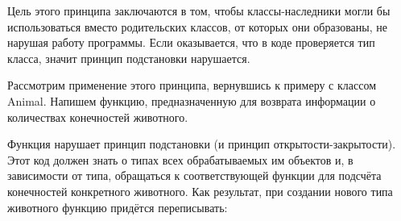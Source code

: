 \documentclass[a4paper]{article}
\begin{document}
Цель этого принципа заключаются в том, чтобы классы-наследники могли бы использоваться вместо родительских классов, от которых они образованы, не нарушая работу программы. Если оказывается, что в коде проверяется тип класса, значит принцип подстановки нарушается.

\newpage
Рассмотрим применение этого принципа, вернувшись к примеру с классом Animal. Напишем функцию, предназначенную для возврата информации о количествах конечностей животного.

\begin{figure}[h]
\end{figure}

Функция нарушает принцип подстановки (и принцип открытости-закрытости). Этот код должен знать о типах всех обрабатываемых им объектов и, в зависимости от типа, обращаться к соответствующей функции для подсчёта конечностей конкретного животного. Как результат, при создании нового типа животного функцию придётся переписывать:
\end{document}
